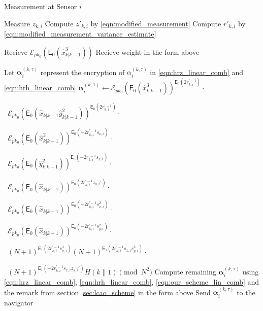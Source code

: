 \begin{algorithm}[htbp]
\caption{Measurement at Sensor $i$}\label{alg:measurement_info}
\begin{algorithmic}[1]

    \State Measure $z_{k,i}$
    \State Compute $z'_{k,i}$ by \eqref{eqn:modified_measurement}
    \State Compute $r'_{k,i}$ by \eqref{eqn:modified_measurement_variance_estimate}

    \State Recieve $\mathcal{E}_{pk_0}(\mathsf{E}_{0}(\hat{x}^3_{k|k-1}))$
        \State Recieve weight in the form above
    \EndFor

    \State Let $\bm{\alpha}_{i}^{(k,\tau)}$ represent the encryption of $\alpha_{i}^{(k,\tau)}$ in \eqref{eqn:hrz_linear_comb} and \eqref{eqn:hrh_linear_comb}
    \State $\bm{\alpha}_{i}^{(k,1)} \gets \mathcal{E}_{pk_0}(\mathsf{E}_{0}(\hat{x}^3_{k|k-1}))^{\mathsf{E}_{0}(2r_{k,i}^{\prime-1})}\cdot$\par
    \ $\mathcal{E}_{pk_0}(\mathsf{E}_{0}(\hat{x}_{k|k-1}\hat{y}^2_{k|k-1}))^{\mathsf{E}_{0}(2r_{k,i}^{\prime-1})}\cdot$\par
    \ $\mathcal{E}_{pk_0}(\mathsf{E}_{0}(\hat{x}^2_{k|k-1}))^{\mathsf{E}_{0}(-2r_{k, i}^{\prime-1}s_{x,i})}\cdot$\par
    \ $\mathcal{E}_{pk_0}(\mathsf{E}_{0}(\hat{y}^2_{k|k-1}))^{\mathsf{E}_{0}(-2r_{k, i}^{\prime-1}s_{x,i})}\cdot$\par
    \ $\mathcal{E}_{pk_0}(\mathsf{E}_{0}(\hat{x}_{k|k-1}))^{\mathsf{E}_{0}(2r_{k,i}^{\prime-1}z_{k,i}')}\cdot$\par
    \ $\mathcal{E}_{pk_0}(\mathsf{E}_{0}(\hat{x}_{k|k-1}))^{\mathsf{E}_{0}(-2r_{k,i}^{\prime-1}s_{x,i}^2)}\cdot$\par
    \ $\mathcal{E}_{pk_0}(\mathsf{E}_{0}(\hat{x}_{k|k-1}))^{\mathsf{E}_{0}(-2r_{k,i}^{\prime-1}s_{y,i}^2)}\cdot$\par
    \ $(N+1)^{\mathsf{E}_{1}(2r_{k,i}^{\prime-1}s_{x,i}^3)}
    (N+1)^{\mathsf{E}_{1}(2r_{k,i}^{\prime-1}s_{x,i}s_{y,i}^2)}\cdot$\par
    \ $(N+1)^{\mathsf{E}_{1}(-2r_{k, i}^{\prime-1}s_{x,i}z_{k,i}')}
    H(k\mathbin\|1)\pmod{N^2}$
    \State Compute remaining $\bm{\alpha}_{i}^{(k,\tau)}$ using \eqref{eqn:hrz_linear_comb}, \eqref{eqn:hrh_linear_comb}, \eqref{eqn:our_scheme_lin_comb} and the remark from section \ref{sec:lcao_scheme} in the form above
        \State Send $\bm{\alpha}_{i}^{(k,\tau)}$ to the navigator
    \EndFor
    \EndProcedure
\end{algorithmic}
\end{algorithm}

